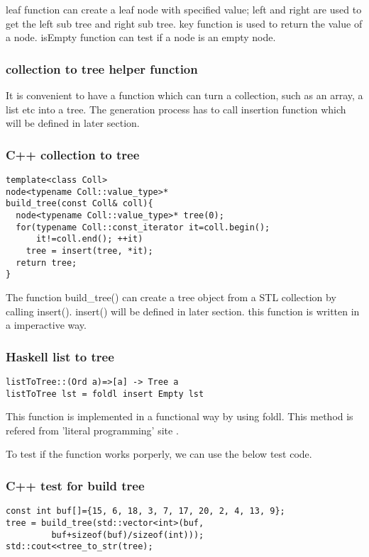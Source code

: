 \documentclass{article}
\begin{document}
leaf function can create a leaf node with specified value; left and right
are used to get the left sub tree and right sub tree. key function is
used to return the value of a node. isEmpty function can test if a node
is an empty node.

\subsubsection{collection to tree helper function} \label{list2tree}
It is convenient to have a function which can turn a collection, such as
an array, a list etc into a tree. The generation process has to call insertion
function which will be defined in later section.

\subsubsection*{C++ collection to tree}
\lstset{language=C++}
\begin{lstlisting}
template<class Coll>
node<typename Coll::value_type>* 
build_tree(const Coll& coll){
  node<typename Coll::value_type>* tree(0);
  for(typename Coll::const_iterator it=coll.begin(); 
      it!=coll.end(); ++it)
    tree = insert(tree, *it);
  return tree;
}
\end{lstlisting}

The function build\_tree() can create a tree object from a STL collection 
by calling insert(). insert() will be defined in later section. this function
is written in a imperactive way.

\subsubsection*{Haskell list to tree}
\lstset{language=Haskell}
\begin{lstlisting}
listToTree::(Ord a)=>[a] -> Tree a
listToTree lst = foldl insert Empty lst
\end{lstlisting}

This function is implemented in a functional way by using foldl. This method
is refered from 'literal programming' site \cite{literal-program}.

To test if the function works porperly, we can use the below test code.
\subsubsection*{C++ test for build tree}
\lstset{language=C++}
\begin{lstlisting}
const int buf[]={15, 6, 18, 3, 7, 17, 20, 2, 4, 13, 9};
tree = build_tree(std::vector<int>(buf, 
         buf+sizeof(buf)/sizeof(int)));
std::cout<<tree_to_str(tree);
\end{lstlisting}
\end{document}
